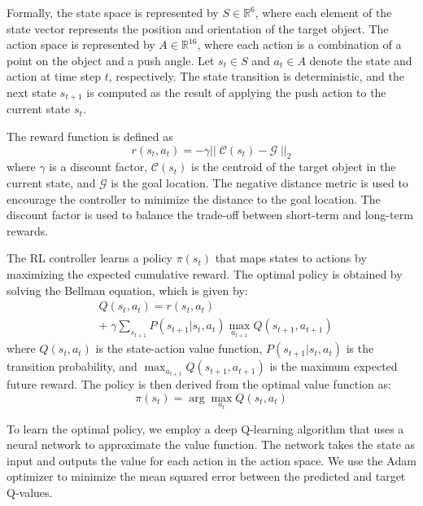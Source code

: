 Formally, the state space is represented by $S \in \mathbb{R}^{6}$, where each element of the state vector represents the position and orientation of the target object. The action space is represented by $A \in \mathbb{R}^{16}$, where each action is a combination of a point on the object and a push angle. Let $s_t \in S$ and $a_t \in A$ denote the state and action at time step $t$, respectively. The state transition is deterministic, and the next state $s_{t+1}$ is computed as the result of applying the push action to the current state $s_t$.

The reward function is defined as 
\begin{equation}
r(s_t, a_t) = -\gamma ||\; \mathcal{C}(s_t) - \mathcal{G}\; ||_2
\end{equation}
where $\gamma$ is a discount factor, $\mathcal{C}(s_t)$ is the centroid of the target object in the current state, and $\mathcal{G}$ is the goal location. The negative distance metric is used to encourage the controller to minimize the distance to the goal location. The discount factor is used to balance the trade-off between short-term and long-term rewards.

The RL controller learns a policy $\pi(s_t)$ that maps states to actions by maximizing the expected cumulative reward. The optimal policy is obtained by solving the Bellman equation, which is given by:
\begin{equation}
\begin{aligned}
    &Q(s_t, a_t) = r(s_t, a_t) \\
    &+\; \gamma \sum_{s_{t+1}} P(s_{t+1}|s_t,a_t) \max_{a_{t+1}} Q(s_{t+1}, a_{t+1})
\end{aligned}
\end{equation}
where $Q(s_t, a_t)$ is the state-action value function, $P(s_{t+1}|s_t,a_t)$ is the transition probability, and $\max_{a_{t+1}} Q(s_{t+1}, a_{t+1})$ is the maximum expected future reward. The policy is then derived from the optimal value function as:
\begin{equation}
    \pi(s_t) = \arg\max_{a_t} Q(s_t, a_t)
\end{equation}

To learn the optimal policy, we employ a deep Q-learning algorithm that uses a neural network to approximate the value function. The network takes the state as input and outputs the value for each action in the action space. We use the Adam optimizer to minimize the mean squared error between the predicted and target Q-values.

